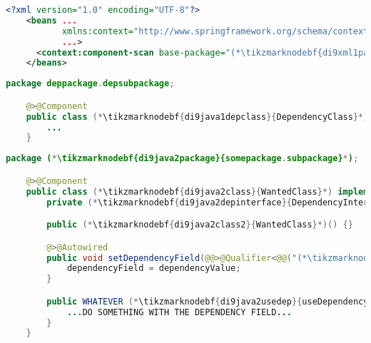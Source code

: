 \newpage

\begin{lstlisting}[language=XML, title={Configuration XML}]
    <?xml version="1.0" encoding="UTF-8"?>
    <beans ...
           xmlns:context="http://www.springframework.org/schema/context"
           ...>
      <context:component-scan base-package="(*\tikzmarknodebf{di9xml1package}{somepackage.subpackage}[ForestGreen]*)"/>
    </beans>
\end{lstlisting}
\begin{lstlisting}[language=Java, title={Dependency class}]
    package deppackage.depsubpackage;

    @>@Component
    public class (*\tikzmarknodebf{di9java1depclass}{DependencyClass}*) implements (*\tikzmarknodebf{di9java1depinterface}{DependencyInterface}*) {
        ...
    }
\end{lstlisting}
\begin{lstlisting}[language=Java, title={Wanted class with the zero--parameter constructor and the setter method}]
    package (*\tikzmarknodebf{di9java2package}{somepackage.subpackage}*);

    @>@Component
    public class (*\tikzmarknodebf{di9java2class}{WantedClass}*) implements (*\tikzmarknodebf{di9java2interface}{WantedClassInterface}*) {
        private (*\tikzmarknodebf{di9java2depinterface}{DependencyInterface}*) dependencyField;

        public (*\tikzmarknodebf{di9java2class2}{WantedClass}*)() {}

        @>@Autowired
        public void setDependencyField(@@>@Qualifier<@@("(*\tikzmarknodebf{di9java2depbeanid}{dependencyClass}[ForestGreen]*)") (*\tikzmarknodebf{di9java2depinterface2}{DependencyInterface}*) dependencyValue) {
            dependencyField = dependencyValue;
        }

        public WHATEVER (*\tikzmarknodebf{di9java2usedep}{useDependency}*)() {
            ...DO SOMETHING WITH THE DEPENDENCY FIELD...
        }
    }
\end{lstlisting}
